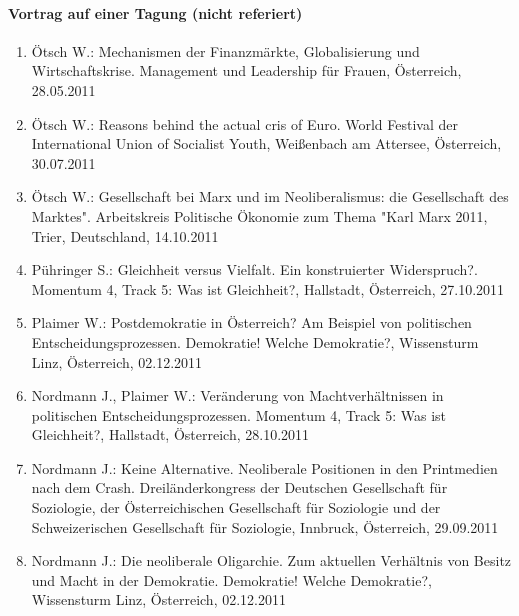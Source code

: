 \paragraph{Vortrag auf einer Tagung (nicht referiert)}
\begin{enumerate}
	\item Ötsch W.: Mechanismen der Finanzmärkte, Globalisierung und Wirtschaftskrise. Management und Leadership für Frauen, Österreich, 28.05.2011
	\item Ötsch W.: Reasons behind the actual cris of Euro. World Festival der International Union of Socialist Youth, Weißenbach am Attersee, Österreich, 30.07.2011
	\item Ötsch W.: Gesellschaft bei Marx und im Neoliberalismus: die Gesellschaft \glqq des Marktes". Arbeitskreis Politische Ökonomie zum Thema "Karl Marx 2011\grqq{}, Trier, Deutschland, 14.10.2011
	\item Pühringer S.: Gleichheit versus Vielfalt. Ein konstruierter Widerspruch?. Momentum 4, Track 5: Was ist Gleichheit?, Hallstadt, Österreich, 27.10.2011
	\item Plaimer W.: Postdemokratie in Österreich? Am Beispiel von politischen Entscheidungsprozessen. Demokratie! Welche Demokratie?, Wissensturm Linz, Österreich, 02.12.2011
	\item Nordmann J., Plaimer W.: Veränderung von Machtverhältnissen in politischen Entscheidungsprozessen. Momentum 4, Track 5: Was ist Gleichheit?, Hallstadt, Österreich, 28.10.2011
	\item Nordmann J.: Keine Alternative. Neoliberale Positionen in den Printmedien nach dem Crash. Dreiländerkongress der Deutschen Gesellschaft für Soziologie, der Österreichischen Gesellschaft für Soziologie und der Schweizerischen Gesellschaft für Soziologie, Innbruck, Österreich, 29.09.2011
	\item Nordmann J.: Die neoliberale Oligarchie. Zum aktuellen Verhältnis von Besitz und Macht in der Demokratie. Demokratie! Welche Demokratie?, Wissensturm Linz, Österreich, 02.12.2011
\end{enumerate}
